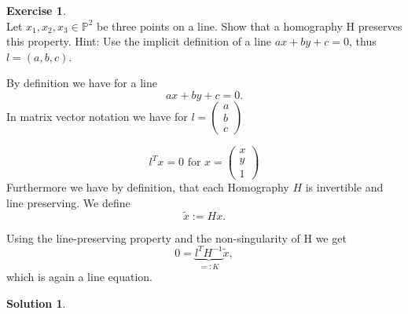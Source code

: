 \documentclass[11pt,english,paper=a4]{scrartcl}
\theoremstyle{definition} %
\newtheorem{Exercise}{Exercise}
\newtheorem*{Solution}{Solution}
\begin{document}
\begin{Exercise}\ \\
	Let $x_1, x_2, x_3 \in \mathbb{P}^2$ be three points on a line. Show that a homography H preserves this property. Hint: Use the implicit definition of a line $ax + by + c = 0$, thus $l = (a,b,c)$.
\end{Exercise}
By definition we have for a line 
\begin{equation*}
ax + by +c = 0.
\end{equation*}
In matrix vector notation we have for 
$l = 
\begin{pmatrix}
a \\
b \\
c
\end{pmatrix}$

\begin{equation*}
l^T x = 0 \text{ for } 
x = \begin{pmatrix}
x \\
y \\
1
\end{pmatrix}
\end{equation*}
Furthermore we have by definition, that each Homography $H$ is invertible and line preserving. We define 
\begin{equation*}
\tilde{x} := Hx.
\end{equation*}

Using the line-preserving property and the non-singularity of H we get
\begin{equation*}
0 = \underbrace{l^T H^{-1}}_{=:K} \tilde{x},
\end{equation*}
which is again a line equation.
\begin{Solution}
	
\end{Solution}


\newpage


\end{document}
